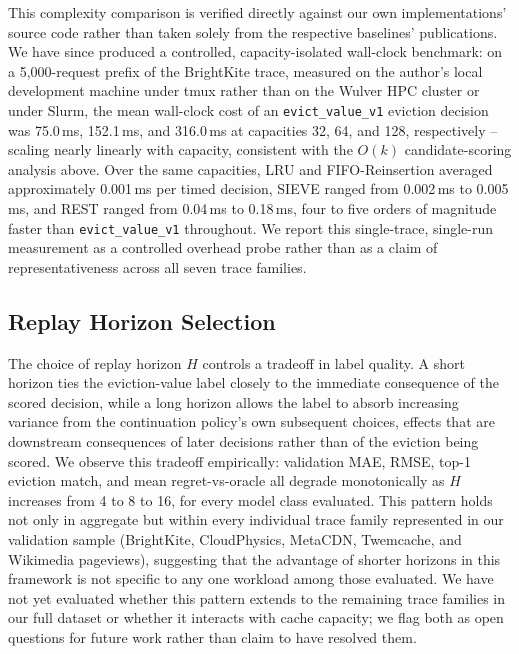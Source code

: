 \documentclass[preprint,12pt]{elsarticle}
\begin{document}
This complexity comparison is verified directly against our own implementations' source code rather than taken solely from the respective baselines' publications. We have since produced a controlled, capacity-isolated wall-clock benchmark: on a 5{,}000-request prefix of the BrightKite trace, measured on the author's local development machine under tmux rather than on the Wulver HPC cluster or under Slurm, the mean wall-clock cost of an \texttt{evict\_value\_v1} eviction decision was 75.0\,ms, 152.1\,ms, and 316.0\,ms at capacities 32, 64, and 128, respectively -- scaling nearly linearly with capacity, consistent with the $O(k)$ candidate-scoring analysis above. Over the same capacities, LRU and FIFO-Reinsertion averaged approximately 0.001\,ms per timed decision, SIEVE ranged from 0.002\,ms to 0.005\,ms, and REST ranged from 0.04\,ms to 0.18\,ms, four to five orders of magnitude faster than \texttt{evict\_value\_v1} throughout. We report this single-trace, single-run measurement as a controlled overhead probe rather than as a claim of representativeness across all seven trace families.

\subsection{Replay Horizon Selection}
\label{subsec:horizon_selection}

The choice of replay horizon $H$ controls a tradeoff in label quality. A short horizon ties the eviction-value label closely to the immediate consequence of the scored decision, while a long horizon allows the label to absorb increasing variance from the continuation policy's own subsequent choices, effects that are downstream consequences of later decisions rather than of the eviction being scored. We observe this tradeoff empirically: validation MAE, RMSE, top-1 eviction match, and mean regret-vs-oracle all degrade monotonically as $H$ increases from 4 to 8 to 16, for every model class evaluated. This pattern holds not only in aggregate but within every individual trace family represented in our validation sample (BrightKite, CloudPhysics, MetaCDN, Twemcache, and Wikimedia pageviews), suggesting that the advantage of shorter horizons in this framework is not specific to any one workload among those evaluated.
We have not yet evaluated whether this pattern extends to the remaining trace families in our full dataset or whether it interacts with cache capacity; we flag both as open questions for future work rather than claim to have resolved them.
\end{document}
